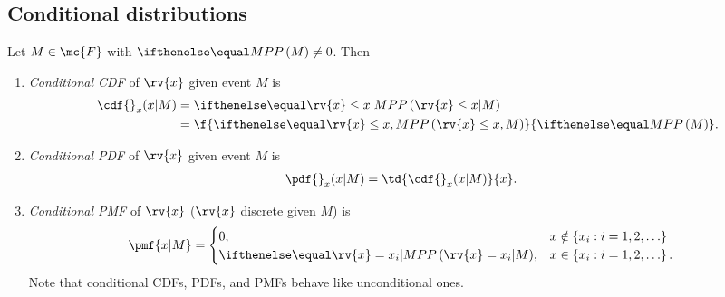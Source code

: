 \subsection{Conditional distributions}
\begin{mydefinition}      
    \label{def:SRV conitional distributions}
    Let $M\in\mc{F}$ with $\prob{M}\neq 0$. Then
    \begin{enumerate}
        \item \emph{Conditional CDF} of $\rv{x}$ given event $M$ is 
        \begin{align}
            \cdf{}_{x}(x|M) &= \prob{\rv{x}\leq x|M}\\
            &= \f{\prob{\rv{x}\leq x,M}}{\prob{M}}.
        \end{align}
        \item \emph{Conditional PDF} of $\rv{x}$ given event $M$ is
        \begin{align}
            \pdf{}_{x}(x|M) &= \td{\cdf{}_{x}(x|M)}{x}.
        \end{align}
        \item \emph{Conditional PMF} of $\rv{x}$ ($\rv{x}$ discrete given $M$) is
        \begin{align}
            \pmf{x|M} 
            &=
            \begin{cases}
                0, &x \notin\left\{ x_{i} : i = 1,2,\ldots\right\}\\
                \prob{\rv{x}=x_{i}|M}, &x\in\left\{ x_{i} : i=1,2,\ldots\right\}.
            \end{cases}
        \end{align}
        Note that conditional CDFs, PDFs, and PMFs behave like unconditional ones.
    \end{enumerate}
\end{mydefinition}
